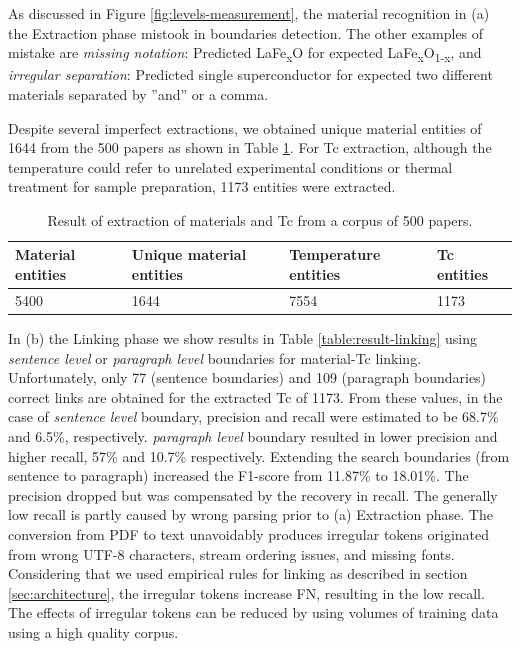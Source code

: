 \documentclass{article}[a4]
\begin{document}
As discussed in Figure \ref{fig:levels-measurement}, the material recognition in (a) the Extraction phase mistook in boundaries detection. The other examples of mistake are \textit{missing notation}: Predicted LaFe\textsubscript{x}O for expected LaFe\textsubscript{x}O\textsubscript{1-x}, and \textit{irregular separation}: Predicted single superconductor for expected two different materials separated by ”and” or a comma. 

Despite several imperfect extractions, we obtained unique material entities of 1644 from the 500 papers as shown in Table \ref{table:result-extraction}. For Tc extraction, although the temperature could refer to unrelated experimental conditions or thermal treatment for sample preparation, 1173 entities were extracted.

\begin{table}[h!]
    \centering
    \caption{Result of extraction of materials and Tc from a corpus of 500 papers.}    
    \begin{tabular}{ | m{4em} | m{4em} | m{6em} | m{5em} | } 
    \hline
        Material entities & Unique material entities & Temperature entities & Tc entities \\
    \hline
        5400 & 1644 & 7554 & 1173 \\ 
    \hline
    \end{tabular}
    \label{table:result-extraction}
\end{table}

In (b) the Linking phase we show results in Table \ref{table:result-linking} using \textit{sentence level} or \textit{paragraph level} boundaries for material-Tc linking. Unfortunately, only 77 (sentence boundaries) and 109 (paragraph boundaries) correct links are obtained for the extracted Tc of 1173. From these values, in the case of \textit{sentence level} boundary, precision and recall were estimated to be 68.7\% and 6.5\%, respectively. \textit{paragraph level} boundary resulted in lower precision and higher recall, 57\% and 10.7\% respectively. Extending the search boundaries (from sentence to paragraph) increased the F1-score from 11.87\% to 18.01\%. The precision dropped but was compensated by the recovery in recall.  
The generally low recall is partly caused by wrong parsing prior to (a) Extraction phase. The conversion from PDF to text unavoidably produces irregular tokens originated from wrong UTF-8 characters, stream ordering issues, and missing fonts.  Considering that we used empirical rules for linking as described in section \ref{sec:architecture}, the irregular tokens increase FN, resulting in the low recall. The effects of irregular tokens can be reduced by using volumes of training data using a high quality corpus.
\end{document}

